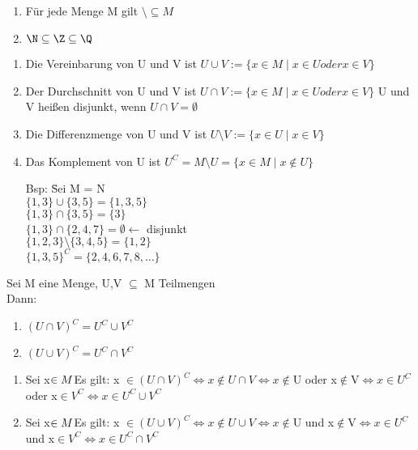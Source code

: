 \bem
\begin{enumerate}
\item Für jede Menge M gilt $\setminus \subseteq M$
\item $\N \subseteq \Z \subseteq \Q$
\end{enumerate}

\begin{enumerate}
\item Die Vereinbarung von U und V ist $U \cup V := \{x \in M \mid x \in U oder x \in V\}$
\item Der Durchschnitt von U und V ist $U \cap V := \{x \in M \mid x \in U oder x \in V\}$
U und V hei{\ss}en disjunkt, wenn $U \cap V = \emptyset$
\item Die Differenzmenge von U und V ist $U \setminus V := \{x \in U \mid x \in V\}$
\item Das Komplement von U ist $U^C = M \setminus U = \{x \in M \mid x {\not\in} U\}$

\begin{tabbing}
Bsp: \= Sei M = N \\
\> $\{1,3\} \cup \{3,5\} = \{1,3,5\}$\\
\> $\{1,3\} \cap \{3,5\} = \{3\}$\\
\> $\{1,3\} \cap \{2,4,7\} = \emptyset \leftarrow$ disjunkt\\
\> $\{1,2,3\} \setminus \{3,4,5\} = \{1,2\}$\\
\> $\{1,3,5\}^C = \{2,4,6,7,8,…\}$
\end{tabbing}

\end{enumerate}


Sei M eine Menge, U,V $\subseteq$ M Teilmengen\\
Dann:
\begin{enumerate}
\item $(U \cap V)^C = U^C \cup V^C$
\item $(U \cup V)^C = U^C \cap V^C$
\end{enumerate}

\bew
\begin{enumerate}
\item Sei x$ \in M\\$Es gilt: x $\in (U \cap V)^C \Leftrightarrow x {\not\in} U \cap V \Leftrightarrow x {\not\in} $U oder x$ {\not\in} $V$\Leftrightarrow x \in U^C$ oder x$\in V^C \Leftrightarrow x\in U^C \cup V^C$
\item Sei x$ \in M\\$Es gilt: x $\in (U \cup V)^C \Leftrightarrow x {\not\in} U \cup V \Leftrightarrow x {\not\in} $U und x$ {\not\in} $V$\Leftrightarrow x \in U^C$ und x$\in V^C \Leftrightarrow x\in U^C \cap V^C$
\end{enumerate}

